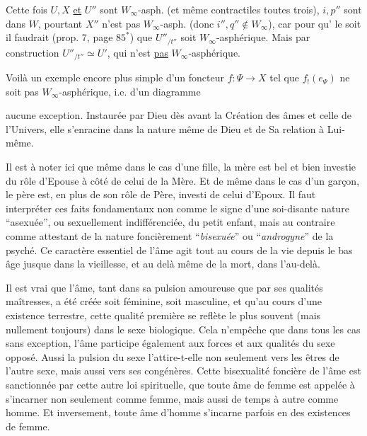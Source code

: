 Cette fois $U,X$ \uline{et} $U''$ sont $W_\infty$-asph. (et même contractiles toutes trois),   $i,p''$ sont dans $W$, pourtant $X''$ n'est pas $W_\infty$-asph. (donc $i'',q''\notin W_\infty$), car pour qu' le soit  il faudrait (prop. 7,  page $85^*$) que  $U''_{/t''}$ soit $W_\infty$-asphérique. Mais par construction $U''_{/t''}\simeq U'$, qui n'est \uline{pas} $W_\infty$-asphérique.



Voilà un exemple encore plus simple d'un foncteur $f:\Psi\longrightarrow X$ tel que $f_!(e_\Psi)$ ne soit pas $W_\infty$-asphérique,  i.e. d'un diagramme



aucune exception. Instaurée par Dieu dès avant la Création des âmes et celle de l'Univers, elle s'enracine dans la nature même de Dieu et de Sa relation à Lui-même.

Il est à noter ici que même dans le cas d'une fille, la mère est bel et bien investie du rôle d'Epouse à côté de celui de la Mère. Et de même dans le cas d'un garçon, le père est, en plus de son rôle de Père, investi de celui d'Epoux. Il faut interpréter ces faits fondamentaux non comme le signe d'une soi-disante nature ``asexuée'', ou sexuellement indifférenciée, du petit enfant, mais au contraire comme attestant de la nature foncièrement ``\textit{bisexuée}'' ou ``\textit{androgyne}'' de la psyché. Ce caractère essentiel de l'âme agit tout au cours de la vie depuis le bas âge jusque dans la vieillesse, et au delà même de la mort, dans l'au-delà.

Il est vrai que l'âme, tant dans sa pulsion amoureuse que par ses qualités maîtresses, a été créée soit féminine, soit masculine, et qu'au cours d'une existence terrestre, cette qualité première se reflète le plus souvent (mais nullement toujours) dans le sexe biologique. Cela n'empêche que dans tous les cas sans exception, l'âme participe également aux forces et aux qualités du sexe opposé. Aussi la pulsion du sexe l'attire-t-elle non seulement vers les êtres de l'autre sexe, mais aussi vers ses congénères. Cette bisexualité foncière de l'âme est sanctionnée par cette autre loi spirituelle, que toute âme de femme est appelée à s'incarner non seulement comme femme, mais aussi de temps à autre comme homme. Et inversement, toute âme d'homme s'incarne parfois en des existences de femme.

